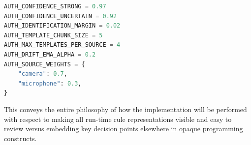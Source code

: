 \begin{lstlisting}[language=Python]
AUTH_CONFIDENCE_STRONG = 0.97
AUTH_CONFIDENCE_UNCERTAIN = 0.92
AUTH_IDENTIFICATION_MARGIN = 0.02
AUTH_TEMPLATE_CHUNK_SIZE = 5
AUTH_MAX_TEMPLATES_PER_SOURCE = 4
AUTH_DRIFT_EMA_ALPHA = 0.2
AUTH_SOURCE_WEIGHTS = {
    "camera": 0.7,
    "microphone": 0.3,
}
\end{lstlisting}

This conveys the entire philosophy of how the implementation will be performed with respect to making all run-time rule representations visible and easy to review versus embedding key decision points elsewhere in opaque programming constructs.